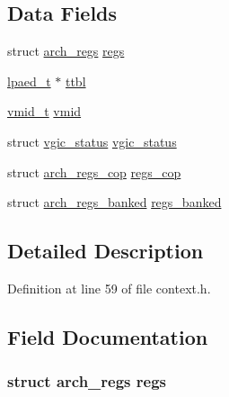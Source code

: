 \subsection*{\-Data \-Fields}
\begin{DoxyCompactItemize}
\item 
struct \hyperlink{structarch__regs}{arch\-\_\-regs} \hyperlink{structhyp__guest__context_a6fd37717ff9cb8421e3e19acc489b565}{regs}
\item 
\hyperlink{unionlpaed__t}{lpaed\-\_\-t} $\ast$ \hyperlink{structhyp__guest__context_af96dd8c0db5b16addac6cbaa292894d1}{ttbl}
\item 
\hyperlink{hvmm__types_8h_af7e9bd0adfb7d10e7a7a0ee60a5f962c}{vmid\-\_\-t} \hyperlink{structhyp__guest__context_a5aaea0584ec137718b51152ba747628b}{vmid}
\item 
struct \hyperlink{structvgic__status}{vgic\-\_\-status} \hyperlink{structhyp__guest__context_aaf1e3e694ca7bf2cbda2d9817f3e9389}{vgic\-\_\-status}
\item 
struct \hyperlink{structarch__regs__cop}{arch\-\_\-regs\-\_\-cop} \hyperlink{structhyp__guest__context_a216fdbbf2a31b2bef63e2c013f25ce51}{regs\-\_\-cop}
\item 
struct \hyperlink{structarch__regs__banked}{arch\-\_\-regs\-\_\-banked} \hyperlink{structhyp__guest__context_a16825e70a665e6368fce044d9f1fdb07}{regs\-\_\-banked}
\end{DoxyCompactItemize}


\subsection{\-Detailed \-Description}


\-Definition at line 59 of file context.\-h.



\subsection{\-Field \-Documentation}
\hypertarget{structhyp__guest__context_a6fd37717ff9cb8421e3e19acc489b565}{
\subsubsection[{regs}]{\setlength{\rightskip}{0pt plus 5cm}struct {\bf arch\-\_\-regs} {\bf regs}}}\label{structhyp__guest__context_a6fd37717ff9cb8421e3e19acc489b565}


